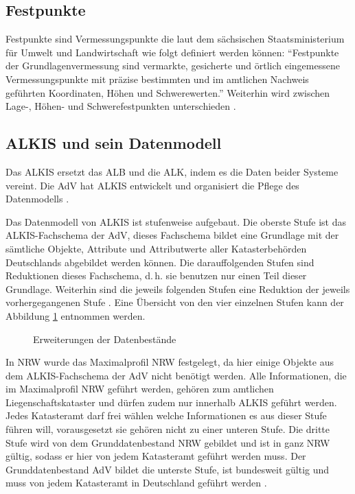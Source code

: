 \subsection{Festpunkte}
Festpunkte sind Vermessungspunkte die laut dem sächsischen Staatsministerium für Umwelt und Landwirtschaft \autocite{sachsen-festpunkt} wie folgt definiert werden können:
\enquote{Festpunkte der Grundlagenvermessung sind vermarkte, gesicherte und örtlich eingemessene Vermessungspunkte mit präzise bestimmten und im amtlichen Nachweis geführten Koordinaten, Höhen und Schwerewerten.} Weiterhin wird zwischen Lage-, Höhen- und Schwerefestpunkten unterschieden \autocite[vgl.][]{adv-festpunkte}.

\subsection{ALKIS und sein Datenmodell}
Das \acf{ALKIS} ersetzt das \acf{ALB} und die \acf{ALK}, indem es die Daten beider Systeme vereint. Die \ac{AdV} hat \acs{ALKIS} entwickelt und organisiert die Pflege des Datenmodells \autocite[vgl.][]{adv-alkis}.

Das Datenmodell von ALKIS ist stufenweise aufgebaut.
Die oberste Stufe ist das ALKIS-Fachschema der AdV, dieses Fachschema bildet eine Grundlage mit der sämtliche Objekte, Attribute und Attributwerte aller Katasterbehörden Deutschlands abgebildet werden können.
Die darauffolgenden Stufen sind Reduktionen dieses Fachschema, d.\,h. sie benutzen nur einen Teil dieser Grundlage.
Weiterhin sind die jeweils folgenden Stufen eine Reduktion der jeweils vorhergegangenen Stufe \autocite[vgl.][1-4]{bezk-grunddaten}.
Eine Übersicht von den vier einzelnen Stufen kann der Abbildung \ref{fig:prod-stufen} entnommen werden. 

\begin{figure}[htbp]
	\centering
	\caption{Erweiterungen der Datenbestände}
	\label{fig:prod-stufen}
\end{figure}

In \ac{NRW} wurde das Maximalprofil NRW festgelegt, da hier einige Objekte aus dem ALKIS-Fachschema der AdV nicht benötigt werden.
Alle Informationen, die im Maximalprofil NRW geführt werden, gehören zum amtlichen Liegenschaftskataster und dürfen zudem nur innerhalb ALKIS geführt werden.
Jedes Katasteramt darf frei wählen welche Informationen es aus dieser Stufe führen will, vorausgesetzt sie gehören nicht zu einer unteren Stufe.
Die dritte Stufe wird von dem Grunddatenbestand NRW gebildet und ist in ganz NRW gültig, sodass er hier von jedem Katasteramt geführt werden muss.
Der Grunddatenbestand AdV bildet die unterste Stufe, ist bundesweit gültig und muss von jedem Katasteramt in Deutschland geführt werden \autocite[vgl.][1-4]{bezk-grunddaten}.

